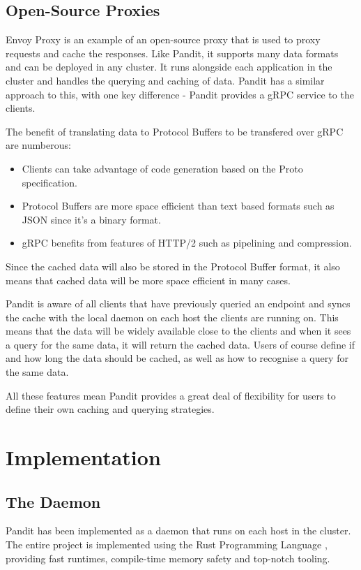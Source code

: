 \documentclass{article}
\begin{document}
\subsection{Open-Source Proxies}
Envoy Proxy \cite{envoy} is an example of an open-source proxy that is used to proxy requests and cache the responses.
Like Pandit, it supports many data formats and can be deployed in any cluster.
It runs alongside each application in the cluster and handles the querying and caching of data.
Pandit has a similar approach to this, with one key difference - Pandit provides a gRPC service to the clients.

The benefit of translating data to Protocol Buffers to be transfered over gRPC are numberous:
\begin{itemize}
    \item Clients can take advantage of code generation based on the Proto specification. \cite{codegen}
    \item Protocol Buffers are more space efficient than text based formats such as JSON since it's a binary format. \cite{encoding}
    \item gRPC benefits from features of HTTP/2 such as pipelining and compression. \cite{http2}
\end{itemize}

Since the cached data will also be stored in the Protocol Buffer format, it also means that cached data will be more space efficient in
many cases.

Pandit is aware of all clients that have previously queried an endpoint and syncs the cache with the local daemon on each host the clients are running on.
This means that the data will be widely available close to the clients and when it sees a query for the same data, it will return the cached data.
Users of course define if and how long the data should be cached, as well as how to recognise a query for the same data.

All these features mean Pandit provides a great deal of flexibility for users to define their own caching and querying strategies.

\section{Implementation}
\subsection{The Daemon}
Pandit has been implemented as a daemon that runs on each host in the cluster.
The entire project is implemented using the Rust Programming Language \cite{rust}, providing fast runtimes, compile-time memory safety
and top-notch tooling.
\end{document}
